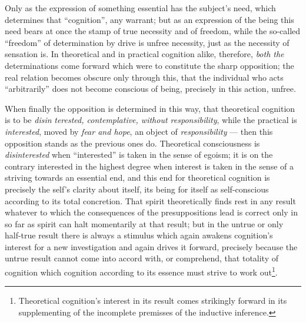 \documentclass[12pt,a4paper]{book}
\begin{document}
Only as the expression of something essential has the subject's need, which
determines that ``cognition'', any warrant; but as an expression of the being
this need bears at once the stamp of true necessity and of freedom, while the
so-called ``freedom'' of determination by drive is unfree necessity, just as
the necessity of sensation is. In theoretical and in practical cognition
alike, therefore, \emph{both the} determinations come forward which were to
constitute the sharp opposition; the real relation becomes obscure only
through this, that the individual who acts ``arbitrarily'' does not become
conscious of being, precisely in this action, unfree.

When finally the opposition is determined in this way, that theoretical
cognition is to be \emph{disin}\-%
\setcounter{footnote}{0}%
\emph{terested, contemplative, without responsibility}, while the practical is
\emph{interested}, moved by \emph{fear and hope}, an object of
\emph{responsibility} --- then this opposition stands as the previous ones do.
Theoretical consciousness is \emph{disinterested} when ``interested'' is taken
in the sense of egoism; it is on the contrary interested in the highest degree
when interest is taken in the sense of a striving towards an essential end,
and this end for theoretical cognition is precisely the self's clarity about
itself, its being for itself as self-conscious according to its total
concretion. That spirit theoretically finds rest in any result whatever to
which the consequences of the presuppositions lead is correct only in so far
as spirit can halt momentarily at that result; but in the untrue or only
half-true result there is always a stimulus which again awakens cognition's
interest for a new investigation and again drives it forward, precisely
because the untrue result cannot come into accord with, or comprehend, that
totality of cognition which cognition according to its essence must strive to
work out\footnote{Theoretical cognition's interest in its result comes
strikingly forward in its supplementing of the incomplete premisses of the
inductive inference.}.
\end{document}
